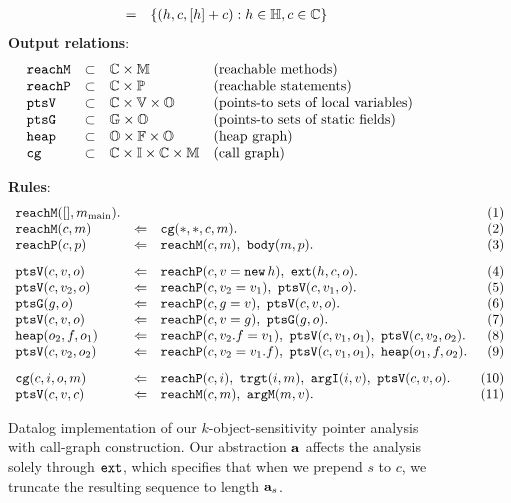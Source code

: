 \begin{figure*}
\begin{minipage}{3.7in}
\[\begin{array}{lcll}
          & =     & \multicolumn{2}{l}{\{ (h, c, [h]+c) : h\in\H, c\in\C \}} \\
\end{array}
\]
{\bf Output relations}: \\
\[ \begin{array}{lcll}
\text{\tt reachM}   &\subset& {\mathbb C} \times {\mathbb M} & \text{(reachable methods)} \\
\text{\tt reachP}   &\subset& {\mathbb C} \times {\mathbb P} & \text{(reachable statements)} \\
\text{\tt ptsV}     &\subset& {\mathbb C} \times {\mathbb V} \times {\mathbb O} & \text{(points-to sets of local variables)} \\
\text{\tt ptsG}     &\subset& {\mathbb G} \times {\mathbb O} & \text{(points-to sets of static fields)} \\
\text{\tt heap}     &\subset& {\mathbb O} \times {\mathbb F} \times {\mathbb O} & \text{(heap graph)} \\
\text{\tt cg}       &\subset& {\mathbb C} \times {\mathbb I} \times {\mathbb C} \times {\mathbb M} & \text{(call graph)}
\end{array}
\]
\end{minipage}
{\bf Rules}: \\
\[
\begin{array}{lclr}
\reachM([],\mmain). &           &  & (1) \\
\reachM(c,m)              &\dlogUpdate& \cg(*,*,c,m). & (2) \\
\reachP(c,p)              &\dlogUpdate& \reachM(c,m),\ \body(m,p). & (3)
\\[8pt]
\ptsV(c,v,o)              &\dlogUpdate& \reachP(c, v = \new\,h),\ \ext(h, c, o). & (4) \\
\ptsV(c,v_2,o)            &\dlogUpdate& \reachP(c, v_2 = v_1),\ \ptsV(c,v_1,o). & (5) \\
\ptsG(g,o)                &\dlogUpdate& \reachP(c, g = v),\ \ptsV(c,v,o). & (6) \\
\ptsV(c,v,o)              &\dlogUpdate& \reachP(c, v = g),\ \ptsG(g,o). & (7) \\
\heap(o_2,f,o_1)          &\dlogUpdate& \reachP(c, v_2.f = v_1),\ \ptsV(c,v_1,o_1),\ \ptsV(c,v_2,o_2). & (8) \\
\ptsV(c,v_2,o_2)          &\dlogUpdate& \reachP(c, v_2 = v_1.f),\ \ptsV(c,v_1,o_1),\ \heap(o_1,f,o_2). & (9)
\\[8pt]
\cg(c,i,o,m)            &\dlogUpdate& \reachP(c,i),\ \trgt(i,m),\ \argI(i,v),\ \ptsV(c,v,o). & (10) \\
\ptsV(c,v,c)             &\dlogUpdate& \reachM(c,m),\ \argM(m,v). & (11)
\end{array}
\]
\caption{Datalog implementation of our $k$-object-sensitivity pointer analysis with call-graph construction.
Our abstraction $\mathbf{a}$ affects the analysis solely through $\text{\tt ext}$,
which specifies that when we prepend $s$ to $c$, we truncate the resulting sequence to length $\mathbf{a}_{s}$.
}
\label{fig:aliasAnalysisRules}
\end{figure*}

